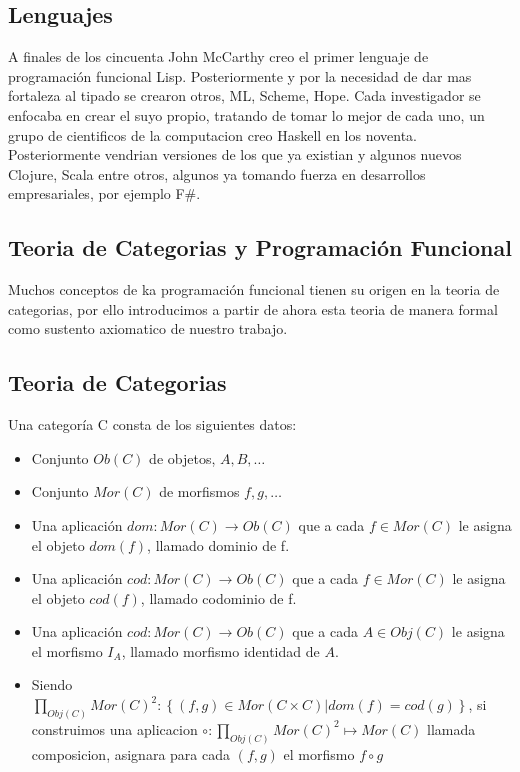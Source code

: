\subsection{Lenguajes}

A finales de los cincuenta John McCarthy creo el primer lenguaje de programación funcional Lisp. Posteriormente y por la necesidad de dar mas fortaleza al tipado se crearon otros, ML, Scheme, Hope. Cada investigador se enfocaba en crear el suyo propio, tratando de tomar lo mejor de cada uno, un grupo de cientificos de la computacion creo Haskell en los noventa. Posteriormente vendrian versiones de los que ya existian y algunos nuevos Clojure, Scala entre otros, algunos ya tomando fuerza en desarrollos empresariales, por ejemplo F\#.

\subsection{Teoria de Categorias y Programación Funcional}

Muchos conceptos de ka programación funcional tienen su origen en la teoria de categorias, por ello introducimos a partir de ahora esta teoria de manera formal como sustento axiomatico de nuestro trabajo.

\subsection{Teoria de Categorias}

\begin{defn}[Categoria]
Una categoría C consta de los siguientes datos:
\begin{itemize}
\item Conjunto $Ob(C)$ de objetos, $A, B, \dots$
\item Conjunto $Mor(C)$ de morfismos $f, g, \dots$
\item Una aplicación $dom : Mor(C) \to Ob(C)$ que a cada $f \in Mor(C)$ le
asigna el objeto $dom(f)$, llamado dominio de f.
\item Una aplicación $cod : Mor(C) \to Ob(C)$ que a cada $f \in Mor(C)$ le
asigna el objeto $cod(f)$, llamado codominio de f.
\item Una aplicación $cod : Mor(C) \to Ob(C)$ que a cada $A \in Obj(C)$ le
asigna el morfismo $I_A$, llamado morfismo identidad de $A$.
\item Siendo $\displaystyle \prod_{Obj(C)} Mor(C)^2 : \left\lbrace (f, g) \in Mor(C \times C) | dom(f)=cod(g) \right\rbrace$, si construimos una aplicacion $\displaystyle \circ : \prod_{Obj(C)} Mor(C)^2 \mapsto Mor(C) $ llamada composicion, asignara para cada $(f,g)$ el morfismo $f \circ g$
\end{itemize}
\end{defn}


